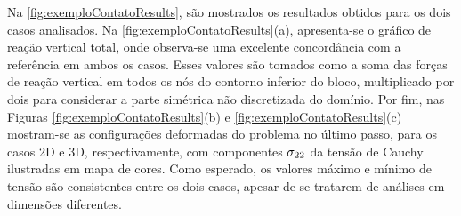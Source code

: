 \documentclass[Tese.tex]{subfiles}
\begin{document}
Na \autoref{fig:exemploContatoResults}, são mostrados os resultados obtidos para os dois casos analisados. Na \autoref{fig:exemploContatoResults}(a), apresenta-se o gráfico de reação vertical total, onde observa-se uma excelente concordância com a referência em ambos os casos. Esses valores são tomados como a soma das forças de reação vertical em todos os nós do contorno inferior do bloco, multiplicado por dois para considerar a parte simétrica não discretizada do domínio. Por fim, nas Figuras \ref{fig:exemploContatoResults}(b) e \ref{fig:exemploContatoResults}(c) mostram-se as configurações deformadas do problema no último passo, para os casos 2D e 3D, respectivamente, com componentes ${\sigma}_{22}$ da tensão de Cauchy ilustradas em mapa de cores. Como esperado, os valores máximo e mínimo de tensão são consistentes entre os dois casos, apesar de se tratarem de análises em dimensões diferentes.
\end{document}
